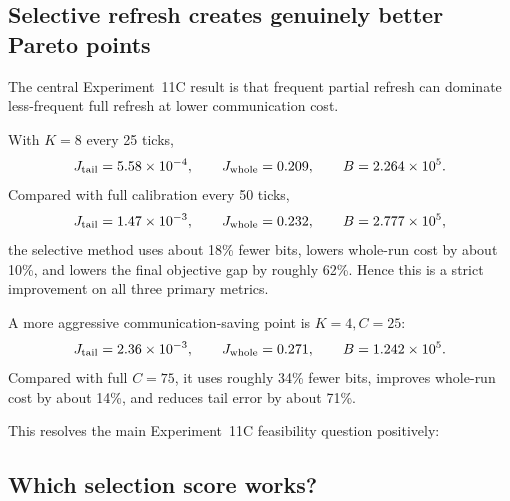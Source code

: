 \subsection{Selective refresh creates genuinely better Pareto points}

The central Experiment~11C result is that frequent partial refresh can dominate less-frequent full refresh at lower communication cost.

With $K=8$ every 25 ticks,
\begin{equation}
  J_{\rm tail}=5.58\times10^{-4},
  \qquad
  J_{\rm whole}=0.209,
  \qquad
  B=2.264\times10^5.
\end{equation}
Compared with full calibration every 50 ticks,
\begin{equation}
  J_{\rm tail}=1.47\times10^{-3},
  \qquad
  J_{\rm whole}=0.232,
  \qquad
  B=2.777\times10^5,
\end{equation}
the selective method uses about 18\% fewer bits, lowers whole-run cost by about 10\%, and lowers the final objective gap by roughly 62\%. Hence this is a strict improvement on all three primary metrics.

A more aggressive communication-saving point is $K=4,C=25$:
\begin{equation}
  J_{\rm tail}=2.36\times10^{-3},
  \qquad
  J_{\rm whole}=0.271,
  \qquad
  B=1.242\times10^5.
\end{equation}
Compared with full $C=75$, it uses roughly 34\% fewer bits, improves whole-run cost by about 14\%, and reduces tail error by about 71\%.

This resolves the main Experiment~11C feasibility question positively:
\begin{center}
\end{center}

\subsection{Which selection score works?}

